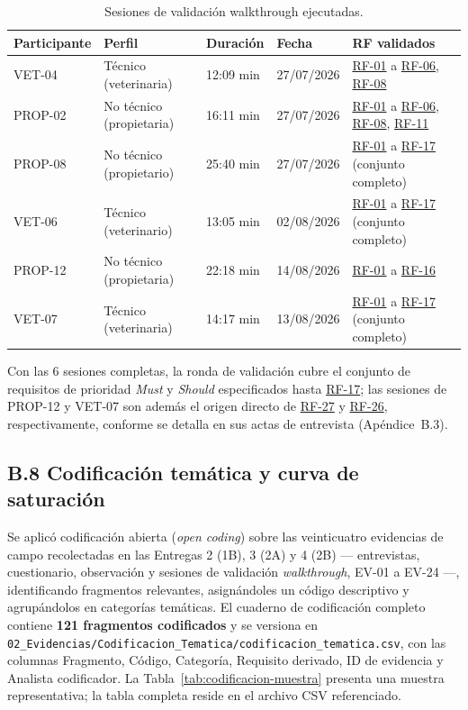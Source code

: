 \documentclass[journal,onecolumn]{IEEEtran}
\begin{document}
	\begin{table}[H]
		\centering
		\small
		\caption{Sesiones de validación walkthrough ejecutadas.}
		\label{tab:walkthrough}
		\begin{tabularx}{\textwidth}{@{}p{2.6cm} p{3.2cm} p{2.4cm} p{1.8cm} X@{}}
			\toprule
			\textbf{Participante} & \textbf{Perfil} & \textbf{Duración} & \textbf{Fecha} & \textbf{RF validados} \\
			\midrule
			VET-04 & Técnico (veterinaria) & 12:09 min & 27/07/2026 & \hyperref[tab:RF-01]{RF-01} a \hyperref[tab:RF-06]{RF-06}, \hyperref[tab:RF-08]{RF-08} \\
			PROP-02 & No técnico (propietaria) & 16:11 min & 27/07/2026 & \hyperref[tab:RF-01]{RF-01} a \hyperref[tab:RF-06]{RF-06}, \hyperref[tab:RF-08]{RF-08}, \hyperref[tab:RF-11]{RF-11} \\
			PROP-08 & No técnico (propietario) & 25:40 min & 27/07/2026 & \hyperref[tab:RF-01]{RF-01} a \hyperref[tab:RF-17]{RF-17} (conjunto completo) \\
			VET-06 & Técnico (veterinario) & 13:05 min & 02/08/2026 & \hyperref[tab:RF-01]{RF-01} a \hyperref[tab:RF-17]{RF-17} (conjunto completo) \\
			PROP-12 & No técnico (propietaria) & 22:18 min & 14/08/2026 & \hyperref[tab:RF-01]{RF-01} a \hyperref[tab:RF-16]{RF-16} \\
			VET-07 & Técnico (veterinaria) & 14:17 min & 13/08/2026 & \hyperref[tab:RF-01]{RF-01} a \hyperref[tab:RF-17]{RF-17} (conjunto completo) \\
			\bottomrule
		\end{tabularx}
	\end{table}
	
	Con las 6 sesiones completas, la ronda de validación cubre el conjunto de
	requisitos de prioridad \emph{Must} y \emph{Should} especificados hasta
	\hyperref[tab:RF-17]{RF-17}; las sesiones de PROP-12 y VET-07 son además el origen directo de
	\hyperref[tab:RF-27]{RF-27} y \hyperref[tab:RF-26]{RF-26}, respectivamente, conforme se detalla en sus actas de
	entrevista (Apéndice~B.3).
	
	
	\subsection*{B.8 Codificación temática y curva de saturación}
	\label{sec:codificacion}
	
	Se aplicó codificación abierta (\emph{open coding}) sobre las veinticuatro
	evidencias de campo recolectadas en las Entregas 2 (1B), 3 (2A) y 4 (2B)
	--- entrevistas, cuestionario, observación y sesiones de validación
	\emph{walkthrough}, EV-01 a EV-24 ---, identificando fragmentos relevantes,
	asignándoles un código descriptivo y agrupándolos en categorías temáticas.
	El cuaderno de codificación completo contiene \textbf{121 fragmentos
		codificados} y se versiona en
	\texttt{02\_Evidencias/Codificacion\_Tematica/codificacion\_tematica.csv},
	con las columnas Fragmento, Código, Categoría, Requisito derivado, ID de
	evidencia y Analista codificador. La Tabla~\ref{tab:codificacion-muestra}
	presenta una muestra representativa; la tabla completa reside en el archivo
	CSV referenciado.
	
\end{document}
